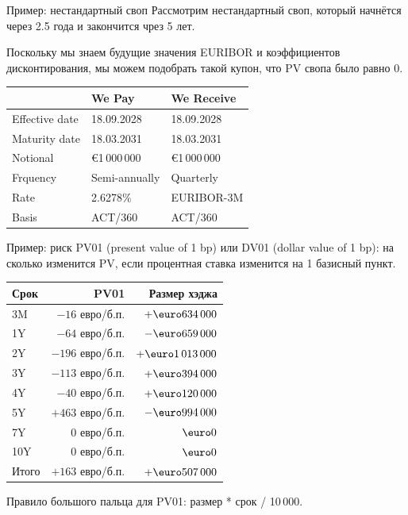 \documentclass{beamer}
\renewcommand{\EUR}[1]{\textup{\euro}#1}
\begin{document}
\begin{frame}{Пример: нестандартный своп}
\justify
Рассмотрим нестандартный своп, который начнётся через 2.5 года и закончится чрез 5 лет.

\justify
Поскольку мы знаем будущие значения EURIBOR и коэффициентов дисконтирования, мы можем 
подобрать такой купон, что PV свопа было равно 0.

\justify
\centering
\begin{tabular}{l|l|l}
& We Pay & We Receive \\ \hline
Effective date & 18.09.2028 & 18.09.2028 \\ 
Maturity date  & 18.03.2031 & 18.03.2031 \\
Notional       & \EUR{1\,000\,000} & \EUR{1\,000\,000} \\
Frquency       & Semi-annually     & Quarterly \\
Rate           & \alert{2.6278\%}          & EURIBOR-3M   \\
Basis          & ACT/360           & ACT/360
\end{tabular}
\end{frame}



\begin{frame}{Пример: риск}
\justify
PV01 (present value of 1 bp) или DV01 (dollar value of 1 bp): на сколько изменится
PV, если процентная ставка изменится на 1 базисный пункт.

\justify
\centering
\begin{tabular}{l|r|r}
Срок  & PV01 & Размер хэджа \\ \hline
3M & $-16$ евро/б.п. & $+\EUR{634\,000}$ \\
1Y   & $-64$  евро/б.п. & $-\EUR{659\,000}$ \\
2Y    & $-196$ евро/б.п. & $+\EUR{1\,013\,000}$ \\
3Y    & $-113$ евро/б.п. & $+\EUR{394\,000}$ \\
4Y    & $-40$  евро/б.п. & $+\EUR{120\,000}$ \\
5Y    & $+463$ евро/б.п. & $-\EUR{994\,000}$ \\ 
7Y    & $0$ евро/б.п. & $\EUR{0}$ \\ 
10Y    & $0$ евро/б.п. & $\EUR{0}$ \\ \hline
Итого & $+163$ евро/б.п. & $+\EUR{507\,000}$
\end{tabular}

\justify
Правило большого пальца для PV01: размер * срок / 10\,000.
\end{frame}
\end{document}
